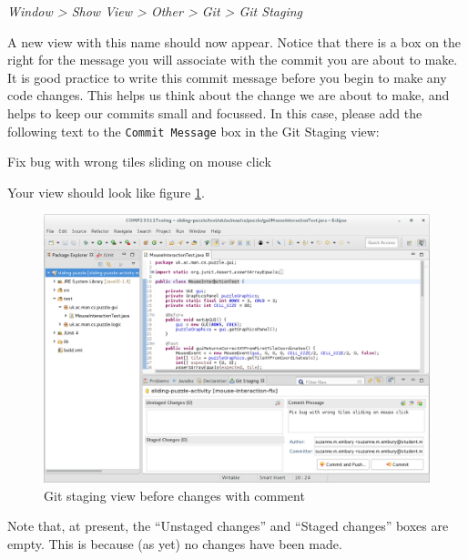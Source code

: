 \documentclass[
]{book}
\newenvironment{Shaded}{\begin{snugshade}}{\end{snugshade}}
\newcommand{\NormalTok}[1]{#1}
\begin{document}
\emph{Window \textgreater{} Show View \textgreater{} Other \textgreater{} Git \textgreater{} Git Staging}

A new view with this name should now appear. Notice that there is a box on the right for the message you will associate with the commit you are about to make. It is good practice to write this commit message before you begin to make any code changes. This helps us think about the change we are about to make, and helps to keep our commits small and focussed. In this case, please add the following text to the \texttt{Commit\ Message} box in the Git Staging view:

\begin{Shaded}
\begin{Highlighting}[]
\NormalTok{Fix bug with wrong tiles sliding on mouse click}
\end{Highlighting}
\end{Shaded}

Your view should look like figure \ref{fig:gitStagingViewBeforeChangesWithComment-fig}.

\begin{figure}

{\centering \includegraphics[width=1\linewidth]{images/gitStagingViewBeforeChangesWithComment} 

}

\caption{Git staging view before changes with comment}\label{fig:gitStagingViewBeforeChangesWithComment-fig}
\end{figure}

Note that, at present, the ``Unstaged changes'' and ``Staged changes'' boxes are empty. This is because (as yet) no changes have been made.
\end{document}
